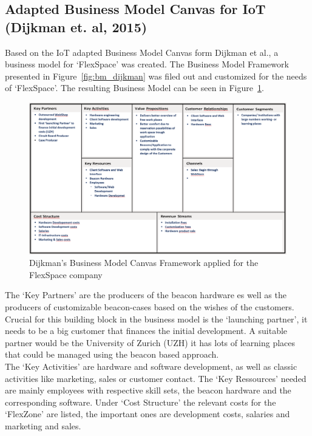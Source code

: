 	\subsection{Adapted Business Model Canvas for IoT (Dijkman et. al, 2015)}

	Based on the IoT adapted Business Model Canvas form Dijkman et al., a business model for `FlexSpace' was created. The Business Model Framework presented in Figure~\ref{fig:bm_dijkman} was filed out and customized for the needs of `FlexSpace'. The resulting Business Model can be seen in Figure~\ref{fig:bmc_flex}.

			\begin{figure}[ht]
			    \begin{center}
			    \includegraphics[scale=0.45]{Talk11/bmc_flex.png}
			    \end{center}
			    \caption{Dijkman's Business Model Canvas Framework applied for the FlexSpace company}
			    \label{fig:bmc_flex}
			\end{figure}
	The `Key Partners' are the producers of the beacon hardware es well as the producers of customizable beacon-cases based on the wishes of the customers. Crucial for this building block in the business model is the `launching partner', it needs to be a big customer that finances the initial development. A suitable partner would be the University of Zurich (UZH) it has lots of learning places that could be managed using the beacon based approach.\\
	The `Key Activities' are hardware and software development, as well as classic activities like marketing, sales or customer contact. The 	`Key Ressources' needed are mainly employees with respective skill sets, the beacon hardware and the corresponding software. Under `Cost Structure' the relevant costs for the `FlexZone' are listed, the important ones are development costs, salaries and marketing and sales.\\
